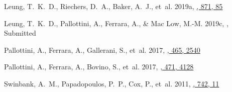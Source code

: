 \documentclass{iau}
\begin{document}
\begin{thebibliography}{}
{Leung}, T.~K.~D., {Riechers}, D.~A., {Baker}, A.~J., {et~al.} 2019a,
  \href{http://dx.doi.org/10.3847/1538-4357/aaf860}{\JournalTitle{\apj}, 871,
  85}
  
{Leung, T.~K.~D., Pallottini, A., Ferrara, A., \& Mac Low, M.-M.} 2019c,
\href{http://dx.doi.org/0}{\JournalTitle{\apj}}, Submitted
  
  
{Pallottini}, A., {Ferrara}, A., {Gallerani}, S., {et~al.} 2017{},
  \href{http://dx.doi.org/10.1093/mnras/stw2847}{\JournalTitle{\mnras}, 465,
  2540}
  
{Pallottini}, A., {Ferrara}, A., {Bovino}, S., {et~al.} 2017{},
  \href{http://dx.doi.org/10.1093/mnras/stx1792}{\JournalTitle{\mnras}, 471,
  4128}

 
  
{Swinbank}, A.~M., {Papadopoulos}, P.~P., {Cox}, P., {et~al.} 2011,
  \href{http://dx.doi.org/10.1088/0004-637X/742/1/11}{\JournalTitle{\apj}, 742,
  11}  

\end{thebibliography}






\end{document}
